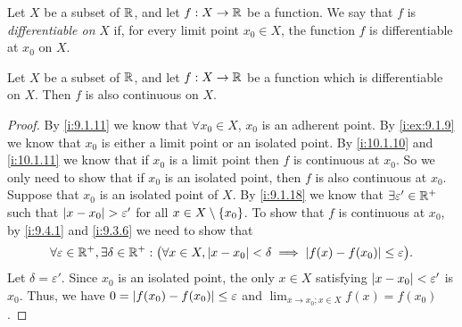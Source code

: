 \begin{defn}\label{i:10.1.11}
  Let \(X\) be a subset of \(\mathbb{R}\), and let \(f : X \to \mathbb{R}\) be a function.
  We say that \(f\) is \emph{differentiable on} \(X\) if, for every limit point \(x_0 \in X\), the function \(f\) is differentiable at \(x_0\) on \(X\).
\end{defn}

\begin{cor}\label{i:10.1.12}
  Let \(X\) be a subset of \(\mathbb{R}\), and let \(f : X \to \mathbb{R}\) be a function which is differentiable on \(X\).
  Then \(f\) is also continuous on \(X\).
\end{cor}

\begin{proof}
  By \cref{i:9.1.11} we know that \(\forall x_0 \in X\), \(x_0\) is an adherent point.
  By \cref{i:ex:9.1.9} we know that \(x_0\) is either a limit point or an isolated point.
  By \cref{i:10.1.10} and \cref{i:10.1.11} we know that if \(x_0\) is a limit point then \(f\) is continuous at \(x_0\).
  So we only need to show that if \(x_0\) is an isolated point, then \(f\) is also continuous at \(x_0\).
  Suppose that \(x_0\) is an isolated point of \(X\).
  By \cref{i:9.1.18} we know that \(\exists \varepsilon' \in \mathbb{R}^+\) such that \(\left\lvert x - x_0\right\rvert > \varepsilon'\) for all \(x \in X \setminus \left\lbrace x_0\right\rbrace\).
  To show that \(f\) is continuous at \(x_0\), by \cref{i:9.4.1} and \cref{i:9.3.6} we need to show that
  \[
    \forall \varepsilon \in \mathbb{R}^+, \exists \delta \in \mathbb{R}^+ : \big(\forall x \in X, \left\lvert x - x_0\right\rvert < \delta \implies \left\lvert f(x) - f(x_0)\right\rvert \leq \varepsilon\big).
  \]
  Let \(\delta = \varepsilon'\).
  Since \(x_0\) is an isolated point, the only \(x \in X\) satisfying \(\left\lvert x - x_0\right\rvert < \varepsilon'\) is \(x_0\).
  Thus, we have \(0 = \left\lvert f(x_0) - f(x_0)\right\rvert \leq \varepsilon\) and \(\lim_{x \to x_0 ; x \in X} f(x) = f(x_0)\).
\end{proof}

